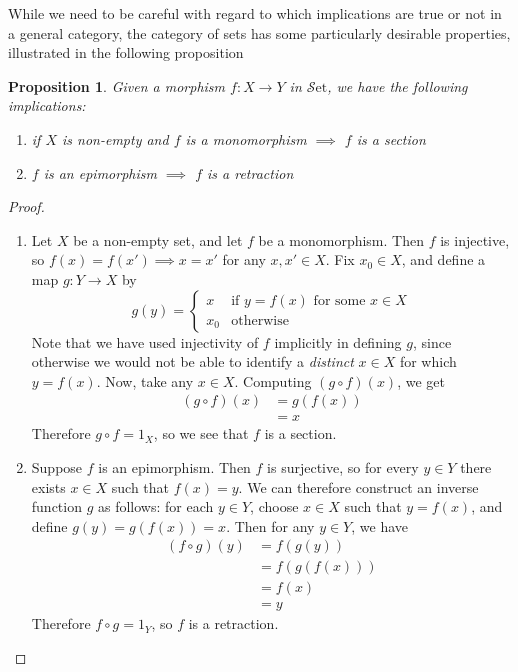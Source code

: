 \documentclass[10pt,oneside]{book}
\def\~#1{\mathscr{#1}}
\newcommand{\Set}{\~S\mathrm{et}}
\theoremstyle{plain}
\newtheorem{prop}[thm]{Proposition}
\theoremstyle{definition}
\theoremstyle{remark}
\numberwithin{equation}{section}
\numberwithin{figure}{section}
\begin{document}
While we need to be careful with regard to which implications are true or not in a general category, the category of sets has some particularly desirable properties, illustrated in the following proposition

\begin{prop}
    Given a morphism $f: X \to Y$ in \textup{$\Set$}, we have the following implications:
    \begin{enumerate}[label=(\roman*)]
        \item if $X$ is non-empty and $f$ is a monomorphism $\implies$ $f$ is a section
        \item $f$ is an epimorphism $\implies$ $f$ is a retraction
    \end{enumerate}
\end{prop}

\begin{proof}
    \hfill
    \begin{enumerate}[label=(\roman*)]
        \item Let $X$ be a non-empty set, and let $f$ be a monomorphism. Then $f$ is injective, so $f(x) = f(x') \implies x = x'$ for any $x, x' \in X$. Fix $x_0 \in X$, and define a map $g: Y \to X$ by
        \[g(y) = \begin{cases}
            x & \text{if } y = f(x) \text{ for some } x \in X \\
            x_0 & \text{otherwise}
        \end{cases}\]
        Note that we have used injectivity of $f$ implicitly in defining $g$, since otherwise we would not be able to identify a \emph{distinct} $x \in X$ for which $y = f(x)$. Now, take any $x \in X$. Computing $(g \circ f)(x)$, we get
        \begin{align*}
            (g \circ f)(x) &= g(f(x)) \\
                  &= x
        \end{align*}
        Therefore $g \circ f = 1_X$, so we see that $f$ is a section. 
        
        \item Suppose $f$ is an epimorphism. Then $f$ is surjective, so for every $y \in Y$ there exists $x \in X$ such that $f(x) = y$. We can therefore construct an inverse function $g$ as follows: for each $y \in Y$, choose $x \in X$ such that $y = f(x)$, and define $g(y) = g(f(x)) = x$. Then for any $y \in Y$, we have
        \begin{align*}
            (f \circ g)(y) &= f(g(y)) \\
                    &= f(g(f(x))) \\
                    &= f(x) \\
                    &= y
        \end{align*}
        Therefore $f \circ g = 1_Y$, so $f$ is a retraction. 
    \end{enumerate}
\end{proof}
\end{document}
